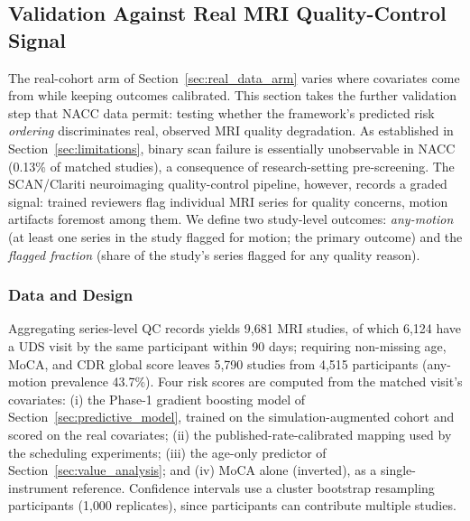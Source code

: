 \documentclass[11pt,a4paper]{article}
\begin{document}
{\color{red}
\subsection{Validation Against Real MRI Quality-Control Signal}
\label{sec:qc_validation}

The real-cohort arm of Section~\ref{sec:real_data_arm} varies where covariates come from while keeping outcomes calibrated. This section takes the further validation step that NACC data permit: testing whether the framework's predicted risk \textit{ordering} discriminates real, observed MRI quality degradation. As established in Section~\ref{sec:limitations}, binary scan failure is essentially unobservable in NACC (0.13\% of matched studies), a consequence of research-setting pre-screening. The SCAN/Clariti neuroimaging quality-control pipeline, however, records a graded signal: trained reviewers flag individual MRI series for quality concerns, motion artifacts foremost among them. We define two study-level outcomes: \textit{any-motion} (at least one series in the study flagged for motion; the primary outcome) and the \textit{flagged fraction} (share of the study's series flagged for any quality reason).

\subsubsection{Data and Design}

Aggregating series-level QC records yields 9{,}681 MRI studies, of which 6{,}124 have a UDS visit by the same participant within 90 days; requiring non-missing age, MoCA, and CDR global score leaves 5{,}790 studies from 4{,}515 participants (any-motion prevalence 43.7\%). Four risk scores are computed from the matched visit's covariates: (i) the Phase-1 gradient boosting model of Section~\ref{sec:predictive_model}, trained on the simulation-augmented cohort and scored on the real covariates; (ii) the published-rate-calibrated mapping used by the scheduling experiments; (iii) the age-only predictor of Section~\ref{sec:value_analysis}; and (iv) MoCA alone (inverted), as a single-instrument reference. Confidence intervals use a cluster bootstrap resampling participants (1{,}000 replicates), since participants can contribute multiple studies.

}
\end{document}
